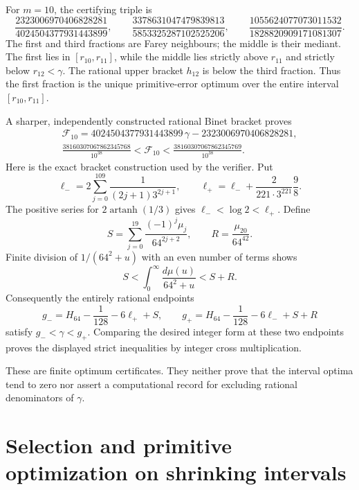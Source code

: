 \documentclass[11pt,a4paper]{article}
\theoremstyle{definition}
\theoremstyle{remark}
\begin{document}
For $m=10$, the certifying triple is
\[
 \frac{2323006970406828281}{4024504377931443899},\qquad
 \frac{3378631047479839813}{5853325287102525206},\qquad
 \frac{1055624077073011532}{1828820909171081307}.
\]
The first and third fractions are Farey neighbours; the middle is
their mediant. The first lies in $[r_{10},r_{11}]$, while the middle
lies strictly above $r_{11}$ and strictly below $r_{12}<\gamma$.
The rational upper bracket $h_{12}$ is below the third fraction.
Thus the first fraction is the unique primitive-error optimum over
the entire interval $[r_{10},r_{11}]$.

A sharper, independently constructed rational Binet bracket proves
\[
 \begin{gathered}
 \mathcal F_{10}
 =4024504377931443899\,\gamma-2323006970406828281,\\
 \frac{38160307067862345768}{10^{38}}
 <\mathcal F_{10}
 <\frac{38160307067862345769}{10^{38}}.
 \end{gathered}
\]
Here is the exact bracket construction used by the verifier.
Put
\[
 \ell_-=
 2\sum_{j=0}^{109}\frac1{(2j+1)3^{2j+1}},\qquad
 \ell_+=\ell_-+\frac{2}{221\cdot3^{221}}\frac98.
\]
The positive series for $2\operatorname{artanh}(1/3)$ gives
$\ell_-<\log2<\ell_+$. Define
\[
 S=\sum_{j=0}^{19}\frac{(-1)^j\mu_j}{64^{2j+2}},
 \qquad R=\frac{\mu_{20}}{64^{42}}.
\]
Finite division of $1/(64^2+u)$ with an even number of terms shows
\[
 S<\int_0^\infty\frac{d\mu(u)}{64^2+u}<S+R.
\]
Consequently the entirely rational endpoints
\[
 g_-=H_{64}-\frac1{128}-6\ell_++S,\qquad
 g_+=H_{64}-\frac1{128}-6\ell_-+S+R
\]
satisfy $g_-<\gamma<g_+$. Comparing the desired integer form at
these two endpoints proves the displayed strict inequalities by
integer cross multiplication.

These are finite optimum certificates. They neither prove that the
interval optima tend to zero nor assert a computational record for
excluding rational denominators of $\gamma$.





\section{Selection and primitive optimization on shrinking intervals}
\label{unified-selection-section}
\end{document}
